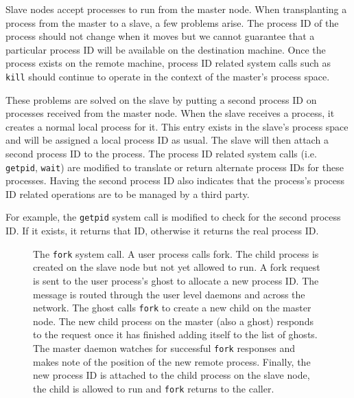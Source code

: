 
Slave nodes accept processes to run from the master node.  When
transplanting a process from the master to a slave, a few problems
arise.  The process ID of the process should not change when it moves
but we cannot guarantee that a particular process ID will be available
on the destination machine.  Once the process exists on the remote
machine, process ID related system calls such as \texttt{kill}
should continue to operate in the context of the master's process
space.


These problems are solved on the slave by putting a second process ID
on processes received from the master node.  When the slave receives a
process, it creates a normal local process for it.  This entry exists
in the slave's process space and will be assigned a local process ID
as usual.  The slave will then attach a second process ID to the
process.  The process ID related system calls (i.e. \texttt{getpid},
\texttt{wait}) are modified to translate or return alternate process
IDs for these processes. Having the second process ID also indicates
that the process's process ID related operations are to be managed by a third
party.

For example, the \texttt{getpid} system call is modified to check
for the second process ID.  If it exists, it returns that ID,
otherwise it returns the real process ID.

\begin{figure}
\begin{center}
\epsfxsize=3.5in

\caption{The \texttt{fork} system call.  A user process calls fork.
The child process is created on the slave node but not yet allowed to
run.  A fork request is sent to the user process's ghost to allocate a
new process ID.  The message is routed through the user level daemons
and across the network.  The ghost calls \texttt{fork} to create a new
child on the master node.  The new child process on the master (also a
ghost) responds to the request once it has finished adding itself to
the list of ghosts.  The master daemon watches for successful
\texttt{fork} responses and makes note of the position of the new
remote process.  Finally, the new process ID is attached to the child process
on the slave node, the child is allowed to run and \texttt{fork}
returns to the caller.}

\label{fig:fork}
\end{center}
\end{figure}

